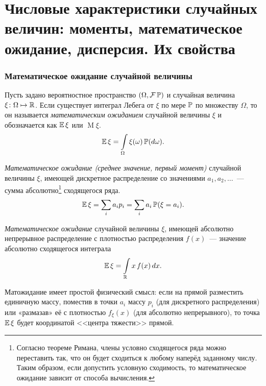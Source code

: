 \section{Числовые характеристики случайных величин: моменты, математическое ожидание, дисперсия. Их свойства}

\subsubsection{Математическое ожидание случайной величины}

\begin{defn}
    Пусть задано вероятностное пространство $(\Omega, \mathcal{F} \operatorname{\mathbb{P}})$ и случайная величина $\xi \colon \Omega \mapsto \mathbb{R}$. 
    Если существует интеграл Лебега от $\xi$ по мере $\operatorname{\mathbb{P}}$ по множеству $\Omega$, то он называется \textit{математическим ожиданием} случайной величины $\xi$ и обозначается как $\operatorname{\mathbb{E}} \xi$ или $\operatorname{M} \! \xi$.
    \begin{equation*}
        \operatorname{\mathbb{E}} \xi = \int\limits_{\Omega} \xi(\omega) \operatorname{\mathbb{P}}(d\omega).
    \end{equation*}
\end{defn}

\begin{defn}
    \textit{Математическое ожидание (среднее значение, первый момент)} случайной величины $\xi$, 
    имеющей дискретное распределение со значениями $a_1, a_2, \ldots$~--- сумма абсолютно\footnote{Согласно теореме Римана, члены условно сходящегося ряда можно переставить так, что он будет сходиться к любому наперёд заданному числу. 
        Таким образом, если допустить условную сходимость, то математическое ожидание зависит от способа вычисления.} 
    сходящегося ряда.
    \begin{equation*}
        \operatorname{\mathbb{E}} \xi=\sum\limits_{i} a_{i} p_{i}=\sum\limits_{i} a_{i} \operatorname{\mathbb{P}}(\xi=a_{i}).
    \end{equation*}
\end{defn}

\begin{defn}
    \textit{Математическое ожидание} случайной величины $\xi$, имеющей абсолютно непрерывное распределение с плотностью распределения $f(x)$~--- значение абсолютно сходящегося интеграла
    \begin{equation*}
        \operatorname{\mathbb{E}} \xi=\int\limits_{\mathbb{R}} x \, f(x) \, dx.
    \end{equation*}
\end{defn}

Матожидание имеет простой физический смысл: если на прямой разместить единичную массу, поместив в точки $a_i$ массу $p_i$ (для дискретного распределения) или «размазав» её с плотностью $f_\xi(x)$ (для абсолютно непрерывного), то точка $\operatorname{\mathbb{E}} \xi$ будет координатой <<центра тяжести>> прямой.


